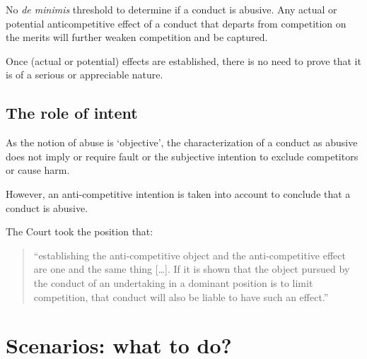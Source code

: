        No \textit{de minimis} threshold to determine if a conduct is abusive.  
        Any actual or potential anticompetitive effect of a conduct that departs from competition on the merits will further weaken competition and be captured.
        
        Once (actual or potential) effects are established, there is no need to prove that it is of a serious or appreciable nature.

    \subsection{The role of intent}

        As the notion of abuse is ‘objective’, the characterization of a conduct as abusive does not imply or require fault or the subjective intention to exclude competitors or cause harm.
    
        However, an anti-competitive intention is taken into account to conclude that a conduct is abusive.
        
        The Court took the position that:  
        \begin{quote}
            “establishing the anti-competitive object and the anti-competitive effect are one and the same thing […]. If it is shown that the object pursued by the conduct of an undertaking in a dominant position is to limit competition, that conduct will also be liable to have such an effect.”
        \end{quote}

\newpage
\section{Scenarios: what to do?}

